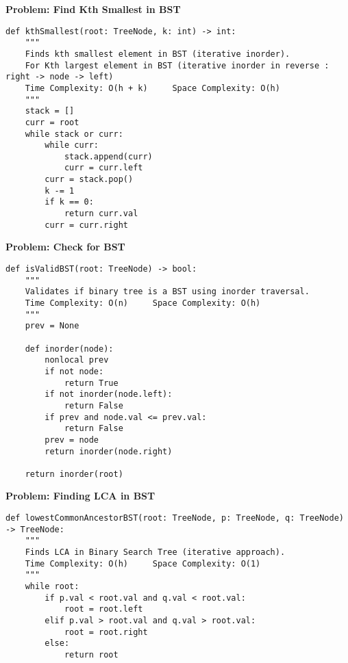 \noindent\textbf{Problem: Find Kth Smallest in BST}
\begin{verbatim}
def kthSmallest(root: TreeNode, k: int) -> int:
    """
    Finds kth smallest element in BST (iterative inorder).
    For Kth largest element in BST (iterative inorder in reverse : right -> node -> left)
    Time Complexity: O(h + k)     Space Complexity: O(h)
    """
    stack = []
    curr = root
    while stack or curr:
        while curr:
            stack.append(curr)
            curr = curr.left
        curr = stack.pop()
        k -= 1
        if k == 0:
            return curr.val
        curr = curr.right
\end{verbatim}
\noindent\textbf{Problem: Check for BST}
\begin{verbatim}
def isValidBST(root: TreeNode) -> bool:
    """
    Validates if binary tree is a BST using inorder traversal.
    Time Complexity: O(n)     Space Complexity: O(h)
    """
    prev = None
    
    def inorder(node):
        nonlocal prev
        if not node:
            return True
        if not inorder(node.left):
            return False
        if prev and node.val <= prev.val:
            return False
        prev = node
        return inorder(node.right)
    
    return inorder(root)
\end{verbatim}
\noindent\textbf{Problem: Finding LCA in BST}
\begin{verbatim}
def lowestCommonAncestorBST(root: TreeNode, p: TreeNode, q: TreeNode) -> TreeNode:
    """
    Finds LCA in Binary Search Tree (iterative approach).
    Time Complexity: O(h)     Space Complexity: O(1)
    """
    while root:
        if p.val < root.val and q.val < root.val:
            root = root.left
        elif p.val > root.val and q.val > root.val:
            root = root.right
        else:
            return root
\end{verbatim}

% 
